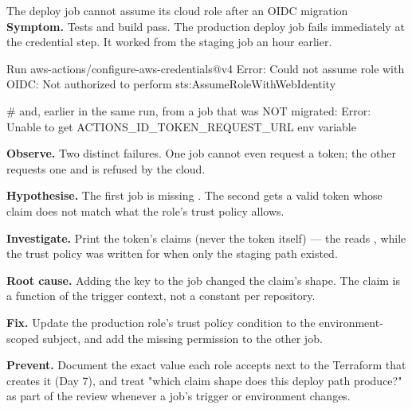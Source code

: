 \begin{debuglab}{The deploy job cannot assume its cloud role after an OIDC migration}
\textbf{Symptom.} Tests and build pass. The production deploy job fails immediately at the credential step. It worked from the staging job an hour earlier.

\begin{outbox}
Run aws-actions/configure-aws-credentials@v4
Error: Could not assume role with OIDC: Not authorized to perform
sts:AssumeRoleWithWebIdentity

# and, earlier in the same run, from a job that was NOT migrated:
Error: Unable to get ACTIONS_ID_TOKEN_REQUEST_URL env variable
\end{outbox}

\begin{tickcheck}
  \item \textbf{Observe.} Two distinct failures. One job cannot even request a token; the other requests one and is refused by the cloud.
  \item \textbf{Hypothesise.} The first job is missing . The second gets a valid token whose  claim does not match what the role's trust policy allows.
  \item \textbf{Investigate.} Print the token's claims (never the token itself) --- the  reads , while the trust policy was written for  when only the staging path existed.
  \item \textbf{Root cause.} Adding the  key to the job changed the  claim's shape. The claim is a function of the trigger context, not a constant per repository.
  \item \textbf{Fix.} Update the production role's trust policy condition to the environment-scoped subject, and add the missing  permission to the other job.
  \item \textbf{Prevent.} Document the exact  value each role accepts next to the Terraform that creates it (Day 7), and treat "which claim shape does this deploy path produce?" as part of the review whenever a job's trigger or environment changes.
\end{tickcheck}
\end{debuglab}


